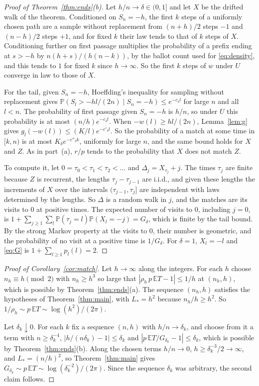 \documentclass[11pt]{amsart}
\theoremstyle{remark}
\numberwithin{equation}{section}
\newcommand{\PP}{\mathbb{P}}
\newcommand{\EE}{\mathbb{E}}
\begin{document}
\begin{proof}[Proof of Theorem~\ref{thm:ends}(b)]
Let $h/n\to\delta\in(0,1]$ and let $X$ be the drifted walk of the theorem. Conditioned on $S_n=-h$, the first $k$ steps of a uniformly chosen path are a sample without replacement from $(n+h)/2$ steps $-1$ and $(n-h)/2$ steps $+1$, and for fixed $k$ their law tends to that of $k$ steps of $X$. Conditioning further on first passage multiplies the probability of a prefix ending at $s>-h$ by $n(h+s)/(h(n-k))$, by the ballot count used for \eqref{eq:density}, and this tends to $1$ for fixed $k$ since $h\to\infty$. So the first $k$ steps of $w$ under $U$ converge in law to those of $X$.

For the tail, given $S_n=-h$, Hoeffding's inequality for sampling without replacement \cite{Hoe63} gives $\PP(S_l>-hl/(2n)\mid S_n=-h)\le e^{-c_\delta l}$ for large $n$ and all $l<n$. The probability of first passage given $S_n=-h$ is $h/n$, so under $U$ this probability is at most $(n/h)e^{-c_\delta l}$. When $-w(l)\ge hl/(2n)$, Lemma~\ref{lem:g} gives $g_l(-w(l))\le(K/l)e^{-c'_\delta l}$. So the probability of a match at some time in $[k,n)$ is at most $K_\delta e^{-c''_\delta k}$, uniformly for large $n$, and the same bound holds for $X$ and $Z$. As in part~(a), $r/p$ tends to the probability that $X$ does not match $Z$.

To compute it, let $0=\tau_0<\tau_1<\tau_2<\dots$ and $\Delta_j=X_{\tau_j}+j$. The times $\tau_j$ are finite because $Z$ is recurrent, the lengths $\tau_j-\tau_{j-1}$ are i.i.d., and given these lengths the increments of $X$ over the intervals $(\tau_{j-1},\tau_j]$ are independent with laws determined by the lengths. So $\Delta$ is a random walk in $j$, and the matches are its visits to $0$ at positive times. The expected number of visits to $0$, including $j=0$, is $1+\sum_{j\ge1}\sum_l\PP(\tau_j=l)\PP(X_l=-j)=G_\delta$, which is finite by the tail bound. By the strong Markov property at the visits to $0$, their number is geometric, and the probability of no visit at a positive time is $1/G_\delta$. For $\delta=1$, $X_l=-l$ and \eqref{eq:G} is $1+\sum_{l\ge1}p_l(l)=2$.
\end{proof}

\begin{proof}[Proof of Corollary~\ref{cor:match}]
Let $h\to\infty$ along the integers. For each $h$ choose $n_h\equiv h\pmod 2$ with $n_h\ge h^3$ so large that $|\rho_h\,p\,\EE T-1|\le1/h$ at $(n_h,h)$, which is possible by Theorem~\ref{thm:ends}(a). The sequence $(n_h,h)$ satisfies the hypotheses of Theorem~\ref{thm:main}, with $L_*=h^2$ because $n_h/h\ge h^2$. So $1/\rho_h\sim p\,\EE T\sim\log(h^2)/(2\pi)$.

Let $\delta_k\downarrow0$. For each $k$ fix a sequence $(n,h)$ with $h/n\to\delta_k$, and choose from it a term with $n\ge\delta_k^{-4}$, $|h/(n\delta_k)-1|\le\delta_k$ and $|p\,\EE T/G_{\delta_k}-1|\le\delta_k$, which is possible by Theorem~\ref{thm:ends}(b). Along the chosen terms $h/n\to0$, $h\ge\delta_k^{-3}/2\to\infty$, and $L_*=(n/h)^2$, so Theorem~\ref{thm:main} gives $G_{\delta_k}\sim p\,\EE T\sim\log(\delta_k^{-2})/(2\pi)$. Since the sequence $\delta_k$ was arbitrary, the second claim follows.
\end{proof}
\end{document}
